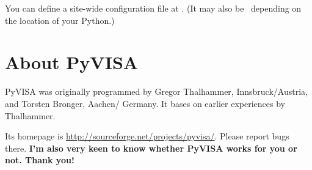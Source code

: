 \documentclass{howto}
\begin{document}
You can define a site-wide configuration file at
.  (It may also be \
depending on the location of your Python.)


\section{About PyVISA}

PyVISA was originally programmed by Gregor Thalhammer, Innsbruck/Austria, and
Torsten Bronger, Aachen/\hskip0pt Germany.  It bases on earlier experiences by
Thalhammer.

Its homepage is \url{http://sourceforge.net/projects/pyvisa/}.  Please report
bugs there.  \textbf{I'm also very keen to know whether PyVISA works for you or
  not.  Thank you!}
\end{document}
